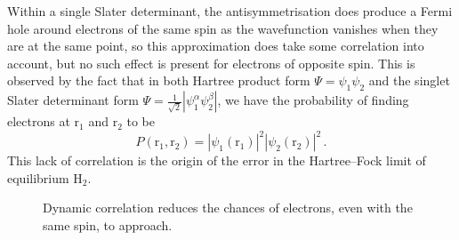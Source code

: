 \documentclass{article}
\theoremstyle{plain}\theoremheaderfont{\normalfont\itshape}\theorembodyfont{\rmfamily}\theoremseparator{.}\newtheorem*{rem}{Remark}\newtheorem*{ex}{Example}\newtheorem*{proof}{Proof}\newtheorem*{altp}{Alternative proof}
\theoremstyle{plain}\theoremheaderfont{\normalfont\bfseries}\theorembodyfont{\rmfamily}\theoremseparator{.}\newtheorem{thm}{Theorem}[section]\newtheorem{lem}[thm]{Lemma}\newtheorem{prop}[thm]{Proposition}\newtheorem*{cor}{Corollary}\newtheorem{defn}[thm]{Definition}\newtheorem{clm}[thm]{Claim}\newtheorem{clminproof}{Claim}\newtheorem{pos}{Postulate}[section]
\theoremstyle{break}\theoremheaderfont{\normalfont\itshape}\theorembodyfont{\rmfamily}\theoremseparator{.\medskip}\newtheorem*{proofskip}{Proof}\newtheorem*{exs}{Examples}\newtheorem*{rems}{Remarks}
\theoremstyle{break}\theoremheaderfont{\normalfont\bfseries}\theorembodyfont{\rmfamily}\theoremseparator{.\medskip}\newtheorem{lemskip}[thm]{Lemma}\newtheorem{defnskip}[thm]{Definition}\newtheorem{propskip}[thm]{Proposition}\newtheorem{thmskip}[thm]{Theorem}
\numberwithin{equation}{section}
\newcommand{\vb}[1]{\bm{\mathrm{#1}}}
\newcommand{\abs}[1]{\left| #1 \right|}
\begin{document}
    Within a single Slater determinant, the antisymmetrisation does produce a Fermi hole around electrons of the same spin as the wavefunction vanishes when they are at the same point, so this approximation does take some correlation into account, but no such effect is present for electrons of opposite spin. This is observed by the fact that in both Hartree product form \(\Psi=\psi_1\psi_2\) and the singlet Slater determinant form \(\Psi=\frac{1}{\sqrt{2}}\abs{\psi_1^\alpha\psi_2^\beta}\), we have the probability of finding electrons at \(\vb{r}_1\) and \(\vb{r}_2\) to be
    \begin{equation}
        P(\vb{r}_1,\vb{r}_2)=\abs{\psi_1(\vb{r}_1)}^2\abs{\psi_2(\vb{r}_2)}^2\,.
    \end{equation}
    This lack of correlation is the origin of the error in the Hartree--Fock limit of equilibrium \(\mathrm{H_2}\).

    \begin{figure}
        \centering
        \caption{Dynamic correlation reduces the chances of electrons, even with the same spin, to approach.}
    \end{figure}
\end{document}
